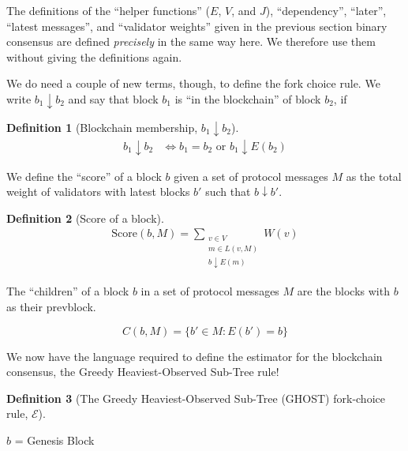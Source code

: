 \documentclass{article}
\theoremstyle{definition}
\newtheorem{defn}{Definition}[section]
\begin{document}
The definitions of the ``helper functions'' ($E$, $V$, and $J$), ``dependency'', ``later'', ``latest messages'', and ``validator weights'' given in the previous section binary consensus are defined \emph{precisely} in the same way here. We therefore use them without giving the definitions again.

We do need a couple of new terms, though, to define the fork choice rule. We write $b_1 \downarrow b_2$ and say that block $b_1$ is ``in the blockchain'' of block $b_2$, if

\begin{defn}[Blockchain membership, $b_1 \downarrow b_2$]
\begin{align}
  b_1 \downarrow b_2 &\iff b_1 = b_2 \text{ or } b_1 \downarrow E(b_2)
\end{align}
\end{defn}

We define the ``score'' of a block $b$ given a set of protocol messages $M$ as the total weight of validators with latest blocks $b'$ such that $b \downarrow b'$.

\begin{defn}[Score of a block]
\begin{align}
\text{Score}(b, M) = \sum_{\substack{v \in V \\ m \in L(v,M) \\ b \downarrow E(m)}} W(v)
\end{align}
\end{defn}

The ``children'' of a block $b$ in a set of protocol messages $M$ are the blocks with $b$ as their prevblock.

$$
C(b,M) = \{b' \in M : E(b') = b\}
$$

We now have the language required to define the estimator for the blockchain consensus, the Greedy Heaviest-Observed Sub-Tree rule!
\begin{defn}[The Greedy Heaviest-Observed Sub-Tree (GHOST) fork-choice rule, $\mathcal{E}$]
\end{defn}

\begin{algorithm}[H]
 $b$ = Genesis Block


\caption{The Greedy Heaviest-Observed Sub-tree Fork-choice rule, $\mathcal{E}$}
\end{algorithm}
\end{document}
